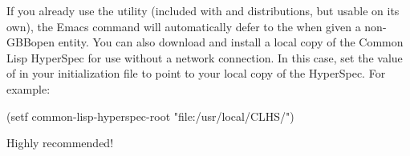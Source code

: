 \documentclass[10pt,twoside,english,pdftex]{article}
\begin{document}
If you already use the
utility (included with
 and
 distributions, but
usable on its own), the Emacs  command will
automatically defer to the  when given a
non-GBBopen entity.  You can also download and install a local copy of the
Common Lisp HyperSpec for use without a network connection.  In this case, set
the value of  in your 
initialization file to point to your local copy of the HyperSpec.  For
example:
%
\W\supp
\begin{example}
  (setf common-lisp-hyperspec-root "file:/usr/local/CLHS/")
\end{example}

Highly recommended!


\W\entities
\T\clearpage
\T\renewcommand{\headrulewidth}{0.01pt}

\end{document}
